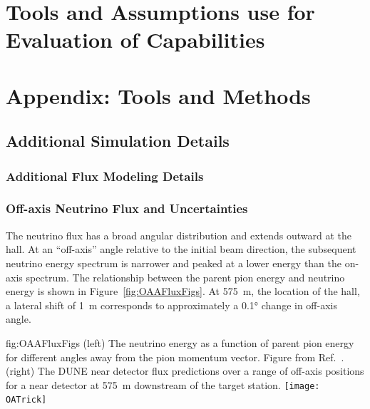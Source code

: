 \section{Tools and Assumptions use for Evaluation of  Capabilities}
\label{sec:tools-nd-eval}


\section{Appendix: Tools and Methods}
\label{sec:tools-appendix}

\subsection{Additional Simulation Details}

\subsubsection{Additional Flux Modeling Details}
\label{sec:tools-app-flx}

\subsubsection{Off-axis Neutrino Flux and Uncertainties}
\label{sec:tools-app-flx-offaxis}

The neutrino flux has a broad angular distribution and extends outward at the  hall. At an ``off-axis'' angle relative to the initial beam direction, the subsequent neutrino energy spectrum is narrower and peaked at a lower energy than the on-axis spectrum.
The relationship between the parent pion energy and neutrino energy is shown in Figure~\ref{fig:OAAFluxFigs}.  At \SI{575}{m}, the location of the  hall, a lateral shift of \SI{1}{m} corresponds to approximately a \ang{0.1} change in off-axis angle.

\begin{dunefigure}{fig:OAAFluxFigs}
{(left) The neutrino energy as a function of parent pion energy for different angles away from the pion momentum vector. Figure from Ref.~\cite{Duffy:2016owt}. (right) The DUNE near detector flux predictions over a range of off-axis positions for a near detector at \SI{575}{m} downstream of the target station. }
    \texttt{[image: OATrick]}
\end{dunefigure}

